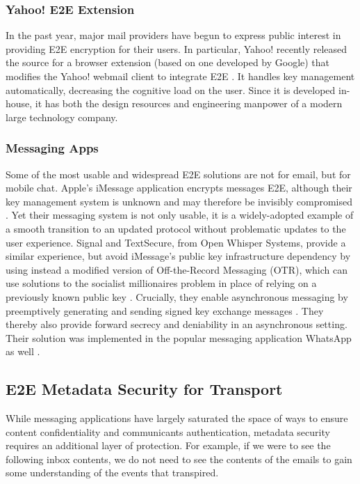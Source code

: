 \documentclass[pageno]{jpaper}
\begin{document}
\subsubsection{Yahoo! E2E Extension}
In the past year, major mail providers have begun to express public interest in providing E2E encryption for their users. In particular, Yahoo! recently released the source for a browser extension (based on one developed by Google) that modifies the Yahoo! webmail client to integrate E2E \cite{yahooe2e}. It handles key management automatically, decreasing the cognitive load on the user. Since it is developed in-house, it has both the design resources and engineering manpower of a modern large technology company.

\subsubsection{Messaging Apps}
Some of the most usable and widespread E2E solutions are not for email, but for mobile chat. Apple's iMessage application encrypts messages E2E, although their key management system is unknown and may therefore be invisibly compromised \cite{imessage}. Yet their messaging system is not only usable, it is a widely-adopted example of a smooth transition to an updated protocol without problematic updates to the user experience. Signal and TextSecure, from Open Whisper Systems, provide a similar experience, but avoid iMessage's public key infrastructure dependency by using instead a modified version of Off-the-Record Messaging (OTR), which can use solutions to the socialist millionaires problem in place of relying on a previously known public key \cite{borisov2004off}. Crucially, they enable asynchronous messaging by preemptively generating and sending signed key exchange messages \cite{whisper}. They thereby also provide forward secrecy and deniability in an asynchronous setting. Their solution was implemented in the popular messaging application WhatsApp as well \cite{whatsapp}.


\subsection{E2E Metadata Security for Transport}
While messaging applications have largely saturated the space of ways to ensure content confidentiality and communicants authentication, metadata security requires an additional layer of protection. For example, if we were to see the following inbox contents, we do not need to see the contents of the emails to gain some understanding of the events that transpired.
\end{document}
